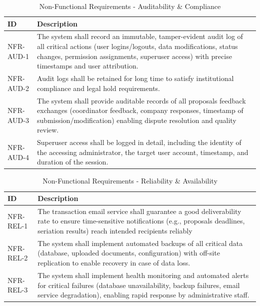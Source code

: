 {
    \begin{table}[H]
        \centering
        \caption{Non-Functional Requirements - Auditability \& Compliance}
        \begin{tabular}{|l|p{11cm}|} %
            \hline
            \textbf{ID} & \textbf{Description} \\ \hline
            NFR-AUD-1 & The system shall record an immutable, tamper-evident audit log of all critical actions (user logins/logouts, data modifications, status changes, permission assignments, superuser access) with precise timestamps and user attribution. \\ \hline
            NFR-AUD-2 & Audit logs shall be retained for long time to satisfy institutional compliance and legal hold requirements. \\ \hline
            NFR-AUD-3 & The system shall provide auditable records of all proposals feedback exchanges (coordinator feedback, company responses, timestamp of submission/modification) enabling dispute resolution and quality review. \\ \hline
            NFR-AUD-4 & Superuser access shall be logged in detail, including the identity of the accessing administrator, the target user account, timestamp, and duration of the session. \\ \hline
        \end{tabular}
    \end{table}    
}

{
    \begin{table}[H]
        \centering
        \caption{Non-Functional Requirements - Reliability \& Availability}
        \begin{tabular}{|l|p{11cm}|} %
            \hline
            \textbf{ID} & \textbf{Description} \\ \hline
            NFR-REL-1 & The transaction email service shall guarantee a good deliverability rate to ensure time-sensitive notifications (e.g., proposals deadlines, seriation results) reach intended recipients reliably \\ \hline
            NFR-REL-2 & The system shall implement automated backups of all critical data (database, uploaded documents, configuration) with off-site replication to enable recovery in case of data loss. \\ \hline
            NFR-REL-3 & The system shall implement health monitoring and automated alerts for critical failures (database unavailability, backup failures, email service degradation), enabling rapid response by administrative staff. \\ \hline
        \end{tabular}
    \end{table}    
}

